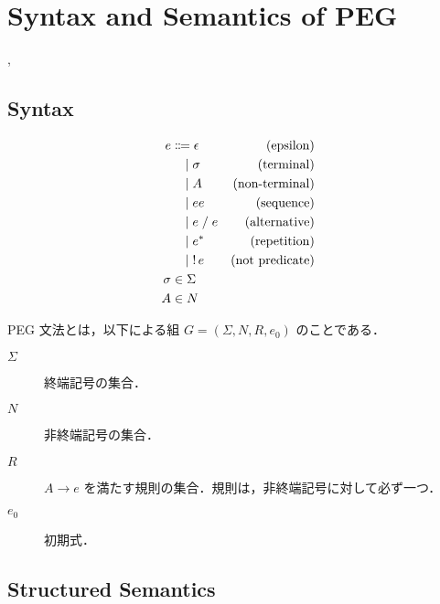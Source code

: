 \section{Syntax and Semantics of PEG}

\cite{Ford:2002}, \cite{Ford:2004}

\subsection{Syntax}

\begin{align*}
  e
  &\Coloneqq \epsilon &(\text{epsilon}) \\
  &\BNFor \sigma &(\text{terminal}) \\
  &\BNFor A &(\text{non-terminal}) \\
  &\BNFor ee &(\text{sequence}) \\
  &\BNFor e \mathrel{/} e &(\text{alternative}) \\
  &\BNFor e^* &(\text{repetition}) \\
  &\BNFor \mathop{!} e &(\text{not predicate}) \\
  \sigma &\in \Sigma \\
  A &\in N
\end{align*}

\begin{definition}
  PEG 文法とは，以下による組 $G = (\Sigma, N, R, e_0)$ のことである．
  \begin{description}
    \item[$\Sigma$] 終端記号の集合．
    \item[$N$] 非終端記号の集合．
    \item[$R$] $A \to e$ を満たす規則の集合．規則は，非終端記号に対して必ず一つ．
    \item[$e_0$] 初期式．
  \end{description}
\end{definition}

\subsection{Structured Semantics}

